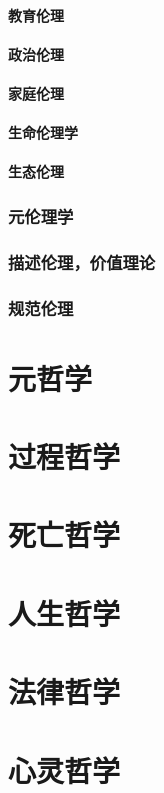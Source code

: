 \documentclass[UTF8]{../RepresentationUniverse}
\begin{document}
        \subsubsection{教育伦理}
        \subsubsection{政治伦理}
        \subsubsection{家庭伦理}
        \subsubsection{生命伦理学}
        \subsubsection{生态伦理}

    \subsection{元伦理学}
    \subsection{描述伦理，价值理论}
    \subsection{规范伦理}
    

\chapter{元哲学}
\chapter{过程哲学}
\chapter{死亡哲学}
\chapter{人生哲学}
\chapter{法律哲学}
\chapter{心灵哲学}
\end{document}
